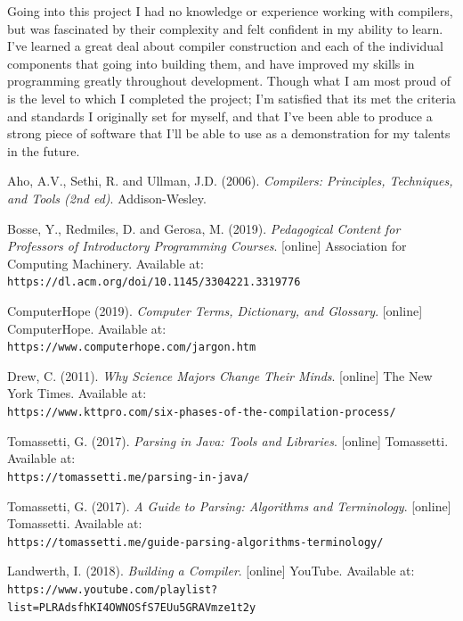 \documentclass[
]{report}
\begin{document}
Going into this project I had no knowledge or experience working with
compilers, but was fascinated by their complexity and felt confident in
my ability to learn. I've learned a great deal about compiler
construction and each of the individual components that going into
building them, and have improved my skills in programming greatly
throughout development. Though what I am most proud of is the level to
which I completed the project; I'm satisfied that its met the criteria
and standards I originally set for myself, and that I've been able to
produce a strong piece of software that I'll be able to use as a
demonstration for my talents in the future.

\begin{thebibliography}{24}
	Aho, A.V., Sethi, R. and Ullman, J.D. (2006).
	\textit{Compilers: Principles, Techniques, and Tools (2nd ed)}. 
	Addison-Wesley.
	
	Bosse, Y., Redmiles, D. and Gerosa, M. (2019).
	\textit{Pedagogical Content for Professors of Introductory Programming Courses}.
	[online] Association for Computing Machinery. Available at:
	\\\texttt{https://dl.acm.org/doi/10.1145/3304221.3319776}
	
	ComputerHope (2019).
	\textit{Computer Terms, Dictionary, and Glossary}.
	[online] ComputerHope. Available at:
	\\\texttt{https://www.computerhope.com/jargon.htm}
	
	Drew, C. (2011).
	\textit{Why Science Majors Change Their Minds}.
	[online] The New York Times. Available at:
	\\\texttt{https://www.kttpro.com/six-phases-of-the-compilation-process/}
	
	Tomassetti, G. (2017).
	\textit{Parsing in Java: Tools and Libraries}.
	[online] Tomassetti. Available at:
	\\\texttt{https://tomassetti.me/parsing-in-java/}
	
	Tomassetti, G. (2017).
	\textit{A Guide to Parsing: Algorithms and Terminology}.
	[online] Tomassetti. Available at:
	\\\texttt{https://tomassetti.me/guide-parsing-algorithms-terminology/}
	
	Landwerth, I. (2018).
	\textit{Building a Compiler}.
	[online] YouTube. Available at:
	\\\texttt{https://www.youtube.com/playlist?list=PLRAdsfhKI4OWNOSfS7EUu5GRAVmze1t2y}
	

\end{thebibliography}
\end{document}
